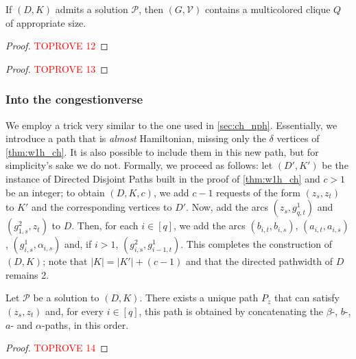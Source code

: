 \documentclass[a4paper,UKenglish,cleveref, autoref, thm-restate]{lipics-v2021}
\newcommand{\pname}[1]{{\sc #1}}
\newcommand{\congestion}{c}
\begin{document}
    \begin{lemma}
      \label{lem:slivkins_backward}
      If $(D, K)$ admits a solution $\mathcal{P}$, then $(G, \mathcal{V})$ contains a
      multicolored clique $Q$ of appropriate size.
    \end{lemma}

    \begin{proof}\textcolor{red}{TOPROVE 12}\end{proof}

    \whch*

    \begin{proof}\textcolor{red}{TOPROVE 13}\end{proof}

    \subsubsection{Into the congestionverse}
    We employ a trick very similar to the one used in \autoref{sec:ch_nph}.
    Essentially, we introduce a path that is \textit{almost} Hamiltonian, missing only
    the $\delta$ vertices of \autoref{thm:w1h_ch}. It is also possible to include
    them in this new path, but for simplicity's sake we do not.
    Formally, we proceed as follows: let $(D', K')$ be the instance of \pname{Directed
    Disjoint Paths} built in the proof of \autoref{thm:w1h_ch} and $\congestion > 1$ be an
    integer; to obtain $(D, K, \congestion)$,
    we add $\congestion-1$ requests of the form $(z_s, z_t)$ to $K'$ and the corresponding vertices
    to $D'$. Now, add the arcs $(z_s, g^1_{q, t})$ and $(g^2_{1, s}, z_t)$ to $D$.
    Then, for each $i \in [q]$, we add the arcs $(b_{i,t}, b_{i,s})$, $(a_{i,t}, a_{i,
    s})$, $(g^1_{i,s}, \alpha_{i,s})$ and, if $i > 1$, $(g^2_{i,s}, g^1_{i-1,t})$.
    This completes the construction of $(D, K)$; note that $|K| = |K'| + (\congestion-1)$ and that
    the directed pathwidth of $D$ remains 2.

    \begin{observation}
      Let $\mathcal{P}$ be a solution to $(D,K)$. There exists a unique path $P_z$ that
      can satisfy $(z_s, z_t)$ and, for every $i \in [q]$, this path is obtained by
      concatenating the $\beta$-, $b$-, $a$- and $\alpha$-paths, in this order.
    \end{observation}

    \begin{proof}\textcolor{red}{TOPROVE 14}\end{proof}
\end{document}
